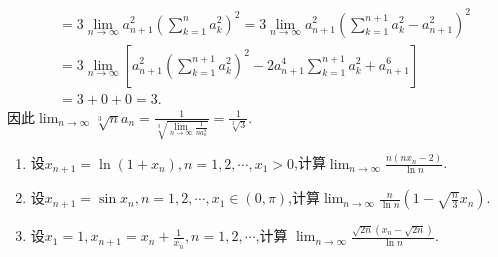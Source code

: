 \documentclass[../../main.tex]{subfiles}%
\begin{document}
\begin{solution}
\begin{align*}
&=3\lim_{n\rightarrow\infty}a_{n + 1}^{2}\left(\sum\limits_{k = 1}^n{a_{k}^{2}}\right)^2=3\lim_{n\rightarrow\infty}a_{n + 1}^{2}\left(\sum\limits_{k = 1}^{n + 1}{a_{k}^{2}}-a_{n + 1}^{2}\right)^2\\
&=3\lim_{n\rightarrow\infty}\left[a_{n + 1}^{2}\left(\sum\limits_{k = 1}^{n + 1}{a_{k}^{2}}\right)^2 - 2a_{n + 1}^{4}\sum\limits_{k = 1}^{n + 1}{a_{k}^{2}}+a_{n + 1}^{6}\right]\\
&=3 + 0 + 0 = 3.
\end{align*}
因此\(\lim_{n\rightarrow\infty}\sqrt[3]{n}a_n=\frac{1}{\sqrt[3]{\lim\limits_{n\rightarrow\infty}\frac{1}{na_{n}^{3}}}}=\frac{1}{\sqrt[3]{3}}\).

\end{solution}

\begin{example}
\begin{enumerate}
\item 设\(x_{n + 1} = \ln(1 + x_n), n = 1, 2, \cdots, x_1 > 0\),计算\(\lim_{n \to \infty} \frac{n(nx_n - 2)}{\ln n}\).

\item 设\(x_{n + 1} = \sin x_n, n = 1, 2, \cdots, x_1 \in (0, \pi)\),计算\(\lim_{n \to \infty} \frac{n}{\ln n}(1 - \sqrt{\frac{n}{3}}x_n)\).

\item 设\(x_1 = 1, x_{n + 1} = x_n + \frac{1}{x_n}, n = 1, 2, \cdots\),计算
\(\lim_{n \to \infty} \frac{\sqrt{2n}(x_n - \sqrt{2n})}{\ln n}\).
\end{enumerate}
\end{example}
\end{document}
